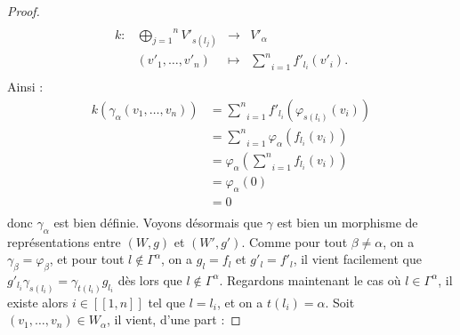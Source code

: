 \documentclass[a4paper,10pt]{article}
\begin{document}
\begin{proof}
\[\begin{array}{lccc}
\end{array}
	\]	
	\[
\begin{array}{lccc}
	k : & \overset{n}{\underset{j=1}{\bigoplus}}V'_{s(l_{j})}&\rightarrow & V'_{\alpha} \\ 
	& (v'_{1},\dots,v'_{n})&\mapsto & \underset{i=1}{\overset{n}{\sum}}f'_{l_{i}}(v'_{i}).\\
\end{array}
	\]
Ainsi :
\[
\begin{array}{rl}
	k(\gamma_{\alpha}(v_{1},\dots,v_{n})) & = \underset{i=1}{\overset{n}{\sum}}f'_{l_{i}}(\varphi_{s(l_{i})}(v_{i})) \\ 
	& = \underset{i=1}{\overset{n}{\sum}} \varphi_{\alpha}(f_{l_{i}}(v_{i}))\\
	& = \varphi_{\alpha}(\underset{i=1}{\overset{n}{\sum}}f_{l_{i}}(v_{i}))\\
	& = \varphi_{\alpha}(0) \\
	& = 0 \\
\end{array}
\]
donc $\gamma_{\alpha}$ est bien définie. Voyons désormais que $\gamma$ est bien un morphisme de représentations entre $(W,g)$ et $(W',g')$. Comme pour tout $\beta\neq\alpha$, on a $\gamma_{\beta}=\varphi_{\beta}$, et pour tout $l\notin\Gamma^{\alpha}$, on a $g_{l}=f_{l}$ et $g'_{l}=f'_{l}$, il vient facilement que $g'_{l_{i}}\gamma_{s(l_{i})}=\gamma_{t(l_{i})}g_{l_{i}}$ dès lors que $l\notin\Gamma^{\alpha}$. Regardons maintenant le cas où $l\in\Gamma^{\alpha}$, il existe alors $i\in[\![1,n]\!]$ tel que $l=l_{i}$, et on a $t(l_{i})=\alpha$. Soit $(v_{1},\dots,v_{n})\in W_{\alpha}$, il vient, d'une part :


\end{proof}
\end{document}

